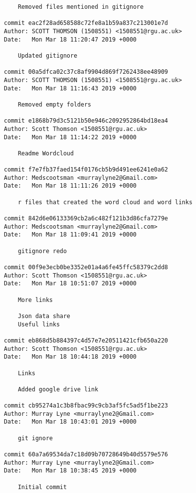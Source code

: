 \begin{lstlisting}
    Removed files mentioned in gitignore

commit eac2f28ad658588c72fe8a1b59a837c213001e7d
Author: SCOTT THOMSON (1508551) <1508551@rgu.ac.uk>
Date:   Mon Mar 18 11:20:47 2019 +0000

    Updated gitignore

commit 00a5dfca02c37c8af9904d869f7262438ee48909
Author: SCOTT THOMSON (1508551) <1508551@rgu.ac.uk>
Date:   Mon Mar 18 11:16:43 2019 +0000

    Removed empty folders

commit e1868b79d3c5121b50e946c2092952864bd18ea4
Author: Scott Thomson <1508551@rgu.ac.uk>
Date:   Mon Mar 18 11:14:22 2019 +0000

    Readme Wordcloud

commit f7e7fb37faed154f0176cb5b9d491ee6241e0a62
Author: Medscootsman <murraylyne2@Gmail.com>
Date:   Mon Mar 18 11:11:26 2019 +0000

    r files that created the word cloud and word links

commit 842d6e06133369cb2a6c482f121b3d86cfa7279e
Author: Medscootsman <murraylyne2@Gmail.com>
Date:   Mon Mar 18 11:09:41 2019 +0000

    gitignore redo

commit 00f9e3ecb0be3352e01a4a6fe45ffc58379c2dd8
Author: Scott Thomson <1508551@rgu.ac.uk>
Date:   Mon Mar 18 10:51:07 2019 +0000

    More links
    
    Json data share
    Useful links

commit eb868d5b884397c4d57e7e20511421cfb650a220
Author: Scott Thomson <1508551@rgu.ac.uk>
Date:   Mon Mar 18 10:44:18 2019 +0000

    Links
    
    Added google drive link

commit cb95274a1c3b8fbac99c9cb3af5fc5ad5f1be223
Author: Murray Lyne <murraylyne2@Gmail.com>
Date:   Mon Mar 18 10:43:01 2019 +0000

    git ignore

commit 60a7a69534da7c18d09b70728649b40d5579e576
Author: Murray Lyne <murraylyne2@Gmail.com>
Date:   Mon Mar 18 10:38:45 2019 +0000

    Initial commit

\end{lstlisting}